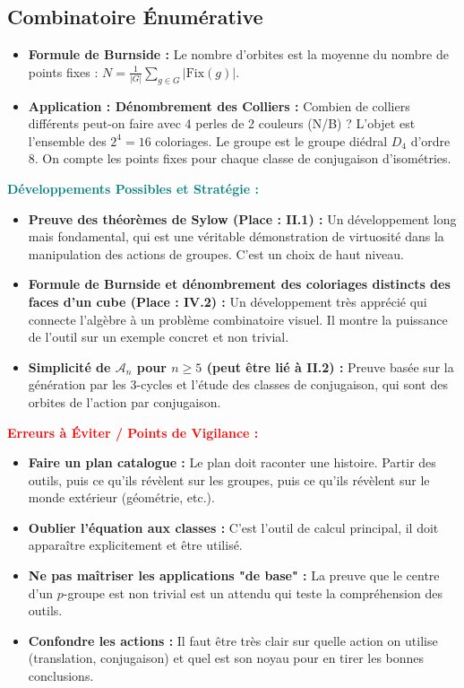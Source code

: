\documentclass[12pt, a4paper, parskip=full]{report}
\theoremstyle{agregstyle}
\newenvironment{developpements}
  {\par\medskip\noindent\begin{oframed}\noindent\textbf{\textcolor{teal}{Développements Possibles et Stratégie :}}}
  {\end{oframed}\par\medskip}
\newenvironment{erreurs}
  {\par\medskip\noindent\begin{oframed}\noindent\textbf{\textcolor{red}{Erreurs à Éviter / Points de Vigilance :}}}
  {\end{oframed}\par\medskip}
\begin{document}
\subsection{Combinatoire Énumérative}
\begin{itemize}
    \item \textbf{Formule de Burnside :} Le nombre d'orbites est la moyenne du nombre de points fixes : $N = \frac{1}{|G|} \sum_{g \in G} |\text{Fix}(g)|$.
    \item \textbf{Application : Dénombrement des Colliers :} Combien de colliers différents peut-on faire avec 4 perles de 2 couleurs (N/B) ? L'objet est l'ensemble des $2^4=16$ coloriages. Le groupe est le groupe diédral $D_4$ d'ordre 8. On compte les points fixes pour chaque classe de conjugaison d'isométries.
\end{itemize}

\begin{developpements}
    \begin{itemize}
        \item \textbf{Preuve des théorèmes de Sylow (Place : II.1) :} Un développement long mais fondamental, qui est une véritable démonstration de virtuosité dans la manipulation des actions de groupes. C'est un choix de haut niveau.
        \item \textbf{Formule de Burnside et dénombrement des coloriages distincts des faces d'un cube (Place : IV.2) :} Un développement très apprécié qui connecte l'algèbre à un problème combinatoire visuel. Il montre la puissance de l'outil sur un exemple concret et non trivial.
        \item \textbf{Simplicité de $\mathcal{A}_n$ pour $n \ge 5$ (peut être lié à II.2) :} Preuve basée sur la génération par les 3-cycles et l'étude des classes de conjugaison, qui sont des orbites de l'action par conjugaison.
    \end{itemize}
\end{developpements}

\begin{erreurs}
    \begin{itemize}
        \item \textbf{Faire un plan catalogue :} Le plan doit raconter une histoire. Partir des outils, puis ce qu'ils révèlent sur les groupes, puis ce qu'ils révèlent sur le monde extérieur (géométrie, etc.).
        \item \textbf{Oublier l'équation aux classes :} C'est l'outil de calcul principal, il doit apparaître explicitement et être utilisé.
        \item \textbf{Ne pas maîtriser les applications "de base" :} La preuve que le centre d'un $p$-groupe est non trivial est un attendu qui teste la compréhension des outils.
        \item \textbf{Confondre les actions :} Il faut être très clair sur quelle action on utilise (translation, conjugaison) et quel est son noyau pour en tirer les bonnes conclusions.
    \end{itemize}
\end{erreurs}
\end{document}
